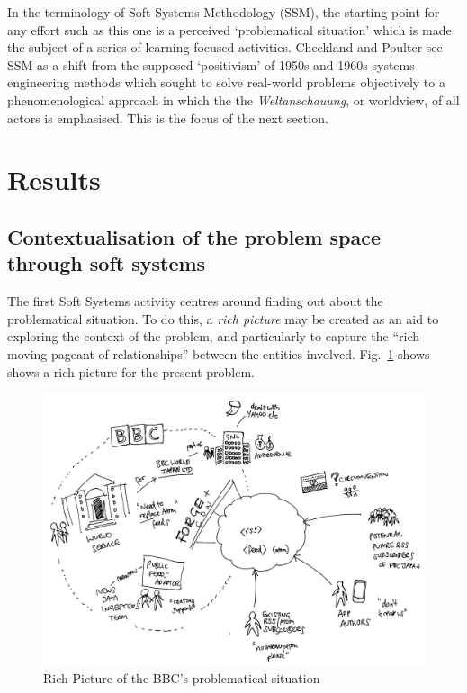 \documentclass[runningheads,a4paper]{llncs}
\begin{document}
In the terminology of Soft Systems Methodology (SSM), the starting point for any effort such as this one is a perceived `problematical situation' which is made the subject of a series of learning-focused activities. Checkland and Poulter \cite{checkland2006} see SSM as a shift from the supposed `positivism' of 1950s and 1960s systems engineering methods which sought to solve real-world problems objectively to a phenomenological approach in which the the \textit{Weltanschauung}, or worldview, of all actors is emphasised. This is the focus of the next section.


\section{Results}

\subsection{Contextualisation of the problem space through soft systems}

The first Soft Systems activity centres around finding out about the problematical situation. To do this, a \textit{rich picture} may be created as an aid to exploring the context of the problem, and particularly to capture the ``rich moving pageant of relationships'' \cite{checkland1990} between the entities involved. Fig.~\ref{fig:richpicture} shows shows a rich picture for the present problem. 

\begin{figure}
\centering
\includegraphics[width=\textwidth]{richpicture}
\caption{Rich Picture of the BBC's problematical situation}
\label{fig:richpicture}
\end{figure}
\end{document}
